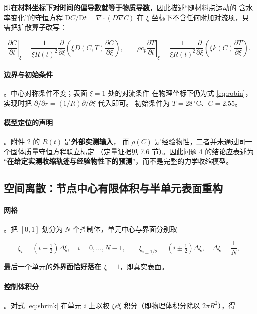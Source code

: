 即\textbf{在材料坐标下对时间的偏导数就等于物质导数}，因此描述“随材料点运动的
含水率变化”的守恒方程 $\mathrm{D}C/\mathrm{D}t=\nabla\cdot(D\nabla C)$
在 $\xi$ 坐标下不含任何附加对流项，只需把扩散算子改写：

\begin{equation}
\left.\frac{\partial C}{\partial t}\right|_{\xi}
=\frac{1}{\xi R(t)^2}\frac{\partial}{\partial\xi}
\left(\xi D(C,T)\frac{\partial C}{\partial\xi}\right),
\qquad
\rho c_p\left.\frac{\partial T}{\partial t}\right|_{\xi}
=\frac{1}{\xi R(t)^2}\frac{\partial}{\partial\xi}
\left(\xi k(C)\frac{\partial T}{\partial\xi}\right).
\label{eq:shrink}
\end{equation}

\paragraph{边界与初始条件}。中心对称条件不变；表面 $\xi=1$ 处的对流条件
在物理坐标下仍为式 \eqref{eq:robin}，实现时把
$\partial/\partial r=(1/R)\partial/\partial\xi$ 代入即可。
初始条件为 $T=28\ ^\circ\mathrm{C}$、$C=2.55$。

\paragraph{模型定位的声明}。附件 2 的 $R(t)$ 是\textbf{外部实测输入}，
而 $\rho(C)$ 是经验物性，二者并未通过同一个固体质量守恒方程联立标定
（定量证据见 7.6 节）。因此问题 4 的结论应表述为
“\textbf{在给定实测收缩轨迹与经验物性下的预测}”，而不是完整的力学收缩模型。

\subsection{空间离散：节点中心有限体积与半单元表面重构}

\paragraph{网格}。把 $[0,1]$ 划分为 $N$ 个控制体，单元中心与界面分别取

\begin{equation}
\xi_i=\left(i+\tfrac12\right)\Delta\xi,\quad i=0,\dots,N-1,
\qquad
\xi_{i\pm1/2}=\left(i\pm\tfrac12\right)\Delta\xi,\quad
\Delta\xi=\frac1N ,
\end{equation}

最后一个单元的\textbf{外界面恰好落在 $\xi=1$}，即真实表面。

\paragraph{控制体积分}。对式 \eqref{eq:shrink} 在单元 $i$ 上以权 $\xi\dd\xi$
积分（即物理体积分除以 $2\pi R^2$），得

